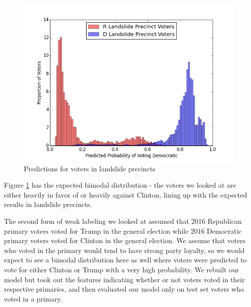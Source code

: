 \documentclass[10pt,twocolumn,letterpaper]{article}
\begin{document}
\begin{figure}[H]
\begin{center}
\includegraphics[scale=0.4]{lanslideHist19}
\end{center}
\caption{Predictions for voters in landslide precincts}
\label{fig:lanslideHist19}
\end{figure}

Figure \ref{fig:lanslideHist19} has the expected bimodal distribution - the voters we looked at are either heavily in favor of or heavily against Clinton, lining up with the expected results in landslide precincts.

The second form of weak labeling we looked at assumed that 2016 Republican primary voters voted for Trump in the general election while 2016 Democratic primary voters voted for Clinton in the general election. We assume that voters who voted in the primary would tend to have strong party loyalty, so we would expect to see a bimodal distribution here as well where voters were predicted to vote for either Clinton or Trump with a very high probability. We rebuilt our model but took out the features indicating whether or not voters voted in their respective primaries, and then evaluated our model only on test set voters who voted in a primary.
\end{document}
